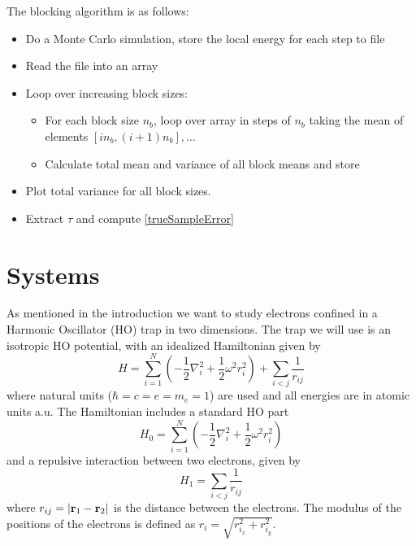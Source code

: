 \documentclass[english, a4paper]{article}
\begin{document}
\noindent The blocking algorithm is as follows:
\begin{itemize}
 \item Do a Monte Carlo simulation, store the local energy for each step to file
 \item Read the file into an array
 \item Loop over increasing block sizes:
 \begin{itemize}
     \item For each block size $n_b$, loop over array in steps of $n_b$ taking the mean of elements
           $[in_b, (i+1)n_b] , \dots $
     \item Calculate total mean and variance of all block means and store
 \end{itemize}
 \item Plot total variance for all block sizes. 
 \item Extract $\tau$ and compute \eqref{trueSampleError}
\end{itemize}

\section{Systems}
As mentioned in the introduction we want to study electrons confined in a Harmonic Oscillator (HO) 
trap in two dimensions. The trap we will use 
is an isotropic HO potential, with an idealized Hamiltonian given by
\begin{equation}
 H = \sum_{i=1}^N\left(-\frac{1}{2} \nabla_i^2 + \frac{1}{2} \omega^2 r_i^2 \right) + \sum_{i<j} \frac{1}{r_{ij}}
 \label{fullHamiltonian}
\end{equation}
where natural units ($\hbar = c = e = m_e = 1$) are used and all energies are in atomic units a.u. 
The Hamiltonian includes a standard HO part
\begin{equation}
 H_0 = \sum_{i=1}^N \left( -\frac{1}{2}\nabla_i^2 + \frac{1}{2}\omega^2 r_i^2 \right)
 \label{HOHamiltonian}
\end{equation}
and a repulsive interaction between two electrons, given by
\begin{equation}
 H_1 = \sum_{i < j} \frac{1}{r_{ij}}
 \label{repulsiveHamiltonian}
\end{equation}
where $r_{ij} = |{\bf r}_1 - {\bf r}_2|$ is the distance between the electrons. 
The modulus of the positions of the electrons is defined as $r_i = \sqrt{r_{i_x}^2 + r_{i_y}^2}$.
\end{document}
